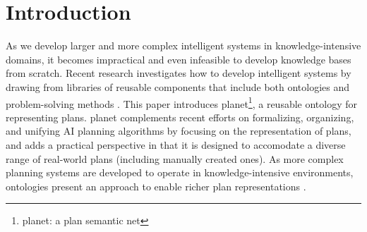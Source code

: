 \begin{abstract}

\end{abstract}




\section{Introduction}

As we develop larger and more complex intelligent systems 
in knowledge-intensive domains,
it becomes impractical and even infeasible to develop
knowledge bases from scratch.  
Recent research investigates how to 
develop intelligent systems by
drawing from libraries of reusable components
that include both ontologies 
\cite{neches91}
and problem-solving methods \cite{kads-book}.  
This paper introduces {\sc planet}\footnote{{\sc planet}: a {\sc plan}
semantic {\sc net}},		  %
a reusable ontology for representing plans.  
{\sc planet} complements recent efforts on formalizing, organizing, 
and unifying AI planning algorithms 
\cite{kambhampati-aij95,tate-aips96,yang-90,nunes-ijcai97}
by focusing on the representation of plans, 
and adds a practical perspective 
in that it is designed 
to accomodate a diverse range of real-world plans
(including manually created ones).  
As more complex planning systems are developed
to operate in knowledge-intensive environments, 
ontologies present an approach to 
enable richer plan representations \cite{hpkb-aimag98,valente-ieee99}.

